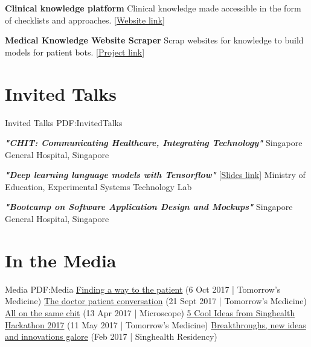 \documentclass[letterpaper,10pt,oneside]{article}
\begin{document}
\begin{body}
\textbf{Clinical knowledge platform}
\newline Clinical knowledge made accessible in the form of checklists and approaches. [\href{http:\\medbot.me}{Website link}]

\textbf{Medical Knowledge Website Scraper}
\newline Scrap websites for knowledge to build models for patient bots. [\href{https://github.com/llja0112/medbot-scraper}{Project link}]

\section
{Invited Talks}
{Invited Talks}
{PDF:InvitedTalks}

\textbf{\textit{"CHIT: Communicating Healthcare, Integrating Technology"}}
\hfill
{}
\BulletItem
Singapore General Hospital, Singapore

\textbf{\textit{"Deep learning language models with Tensorflow"}} [\href{https://docs.google.com/presentation/d/1j9aBhWh-o_5lJal6atPUIKcks-qvezNcnWFJiGoPtlY/edit?usp=sharing}{Slides link}]
\hfill
{}
\BulletItem
Ministry of Education, Experimental Systems Technology Lab
\GapNoBreak

\textbf{\textit{"Bootcamp on Software Application Design and Mockups"}}
\hfill
{}
\BulletItem
Singapore General Hospital, Singapore

\section
{In the Media}
{Media}
{PDF:Media}
\BulletItem \href{https://www.singhealth.com.sg/TomorrowsMed/Article/Pages/Finding_the_way_to_patient.aspx}{Finding a way to the patient} (6 Oct 2017 | Tomorrow's Medicine)
\BulletItem \href{https://www.singhealth.com.sg/TomorrowsMed/Article/Pages/The_doctor-patient_conversation.aspx}{The doctor patient conversation} (21 Sept 2017 | Tomorrow's Medicine)
\BulletItem \href{https://www.duke-nus.edu.sg/microscope/content/all-same-chit}{All on the same chit} (13 Apr 2017 | Microscope)
\BulletItem \href{https://www.singhealth.com.sg/TomorrowsMed/Article/Pages/5-cool-ideas-from-singhealth-hackathon-2017.aspx}{5 Cool Ideas from Singhealth Hackathon 2017} (11 May 2017 | Tomorrow's Medicine)
\BulletItem \href{http://www.singhealthresidency.com.sg/Pages/msc_45_ff.aspx}{Breakthroughs, new ideas and innovations galore} (Feb 2017 | Singhealth Residency)


\end{body}
\end{document}
